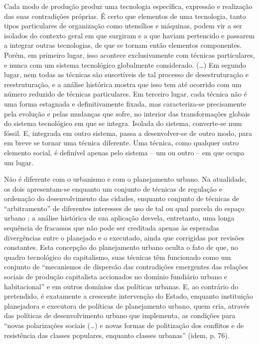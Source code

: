 \begin{citacao}
Cada modo de produção produz uma tecnologia específica, expressão e realização das suas contradições próprias. É certo que elementos de uma tecnologia, tanto tipos particulares de organização como utensílios e máquinas, podem vir a ser isolados do contexto geral em que surgiram e a que haviam pertencido e passarem a integrar outras tecnologias, de que se tornam então elementos componentes. Porém, em primeiro lugar, isso acontece exclusivamente com técnicas particulares, e nunca com um sistema tecnológico globalmente considerado. (…) Em segundo lugar, nem todas as técnicas são suscetíveis de tal processo de desestruturação e reestruturação, e a análise histórica mostra que isso tem até ocorrido com um número reduzido de técnicas particulares. Em terceiro lugar, cada técnica não é uma forma estagnada e definitivamente fixada, mas caracteriza-se precisamente pela evolução e pelas mudanças que sofre, no interior das transformações globais do sistema tecnológico em que se integra. Isolada do sistema, converte-se num fóssil. E, integrada em outro sistema, passa a desenvolver-se de outro modo, para em breve se tornar uma técnica diferente. Uma técnica, como qualquer outro elemento social, é definível apenas pelo sistema – um ou outro – em que ocupa um lugar. \cite[p.~312]{BERNARDO1991}
\end{citacao}

Não é diferente com o urbanismo e com o planejamento urbano. Na atualidade, os dois apresentam-se enquanto um conjunto de técnicas de regulação e ordenação do desenvolvimento das cidades, enquanto conjunto de técnicas de ``arbitramento'' de diferentes interesses de uso de tal ou qual parcela do espaço urbano \cite{bernardi_organizacao_2007, campbell_intro_2003, duarte_planejamento_2007, fainstein_intro_2002}; a análise histórica de sua aplicação desvela, entretanto, uma longa sequência de fracassos \cite{hall_cidades_2007, SANTOS1982} que não pode ser creditada apenas às esperadas divergências entre o planejado e o executado, ainda que corrigidas por revisões constantes. Esta concepção do planejamento urbano oculta o fato de que, no quadro tecnológico do capitalismo, suas técnicas têm funcionado como um conjunto de ``mecanismos de dispersão das contradições emergentes das relações sociais de produção capitalista accionados no domínio fundiário urbano e habitacional'' \cite[p~76]{SANTOS1982} e em outros domínios das políticas urbanas. E, ao contrário do pretendido, é exatamente a crescente intervenção do Estado, enquanto instituição planejadora e executora de políticas de planejamento urbano, quem cria, através das políticas de desenvolvimento urbano que implementa, as condições para ``novas polarizações sociais (…) e novas formas de politização dos conflitos e de resistência das classes populares, enquanto classes urbanas'' (idem, p. 76).

